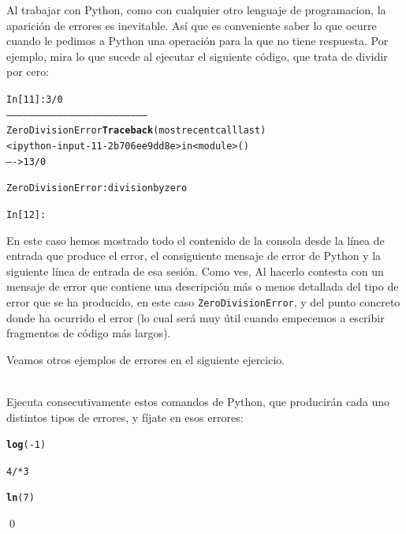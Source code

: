 \documentclass[10pt,a4paper]{article}\usepackage[]{graphicx}\usepackage[]{color}
\makeatletter
\newcommand{\hlnum}[1]{\textcolor[rgb]{0.686,0.059,0.569}{#1}}%
\newcommand{\hlopt}[1]{\textcolor[rgb]{0,0,0}{#1}}%
\newcommand{\hlstd}[1]{\textcolor[rgb]{0.345,0.345,0.345}{#1}}%
\newcommand{\hlkwd}[1]{\textcolor[rgb]{0.737,0.353,0.396}{\textbf{#1}}}%
\newenvironment{kframe}{%
 \def\at@end@of@kframe{}%
 \ifinner\ifhmode%
  \def\at@end@of@kframe{\end{minipage}}%
  \begin{minipage}{\columnwidth}%
 \fi\fi%
 \def\FrameCommand##1{\hskip\@totalleftmargin \hskip-\fboxsep
 \colorbox{shadecolor}{##1}\hskip-\fboxsep
     \hskip-\linewidth \hskip-\@totalleftmargin \hskip\columnwidth}%
 \MakeFramed {\advance\hsize-\width
   \@totalleftmargin\z@ \linewidth\hsize
   \@setminipage}}%
 {\par\unskip\endMakeFramed%
 \at@end@of@kframe}
\newenvironment{knitrout}{}{} %
\newcounter {cont01}
\makeatother
\begin{document}
Al trabajar con Python, como con cualquier otro lenguaje de programacion, la aparición de errores es inevitable. Así que es conveniente saber lo que ocurre cuando le pedimos a Python una operación para la que no tiene respuesta. Por ejemplo, mira lo que sucede al ejecutar el siguiente código, que trata de dividir por cero:
\begin{knitrout}
\color{fgcolor}\begin{kframe}
\begin{alltt}
In [11]: 3 / 0
---------------------------------------------------------------------------
ZeroDivisionError                         \hlkwd{Traceback} (most recent call last)
<ipython-input-11-2b706ee9dd8e> in <module>()
----> 1 3 / 0

ZeroDivisionError: division by zero

In [12]:
\end{alltt}
\end{kframe}
\end{knitrout}
En este caso hemos mostrado todo el contenido de la consola desde la línea de entrada que produce el error, el consiguiente mensaje de error de Python y la siguiente línea de entrada de esa sesión. Como ves, Al hacerlo contesta con un mensaje de error que contiene una descripción más o menos detallada del tipo de error que se ha producido, en este caso {\tt ZeroDivisionError}, y del punto concreto donde ha ocurrido el error (lo cual será muy útil cuando empecemos a escribir fragmentos de código más largos).

Veamos otros ejemplos de errores en el siguiente ejercicio.
\begin{ejercicio}
\label{tut02:ejercicio03}
\quad\\
Ejecuta consecutivamente estos comandos de Python, que producirán cada uno distintos tipos de errores, y fíjate en esos errores:
\begin{knitrout}
\color{fgcolor}\begin{kframe}
\begin{alltt}
\hlkwd{log}\hlstd{(}\hlopt{-}\hlnum{1}\hlstd{)}
\end{alltt}
\end{kframe}
\end{knitrout}
\begin{knitrout}
\color{fgcolor}\begin{kframe}
\begin{alltt}
4/*3
\end{alltt}
\end{kframe}
\end{knitrout}
\begin{knitrout}
\color{fgcolor}\begin{kframe}
\begin{alltt}
\hlkwd{ln}\hlstd{(}\hlnum{7}\hlstd{)}
\end{alltt}
\end{kframe}
\end{knitrout}
\qed
\end{ejercicio}
\end{document}
